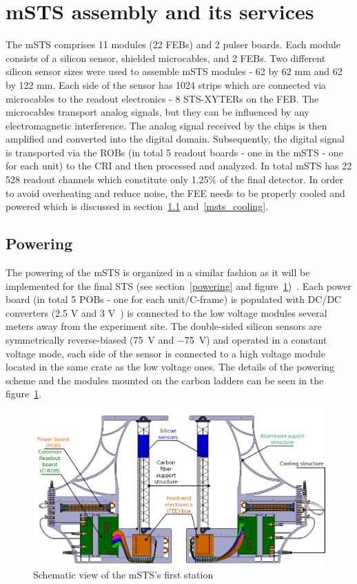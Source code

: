 \section{mSTS assembly and its services}
 The \gls{mSTS} comprises 11 modules (22 \glspl{FEB}) and 2 pulser boards. Each module consists of a silicon sensor, shielded microcables, and 2 \gls{FEB}s. Two different silicon sensor sizes were used to assemble \gls{mSTS} modules - 62 by 62 mm and 62 by 122 mm. Each side of the sensor has 1024 strips which are connected via microcables to the readout electronics - 8 STS-XYTERs on the \gls{FEB}. The microcables transport analog signals, but they can be influenced by any electromagnetic interference. The analog signal received by the chips is then amplified and converted into the digital domain. Subsequently, the digital signal is transported via the \gls{ROB}s (in total 5 readout boards - one in the \gls{mSTS} - one for each unit) to the \gls{CRI} and then processed and analyzed. In total \gls{mSTS} has 22 528 readout channels which constitute only 1.25\% of the final detector. In order to avoid overheating and reduce noise, the \gls{FEE} needs to be properly cooled and powered which is discussed in section~\ref{msts_powering} and~\ref{msts_cooling}. 
\subsection{Powering}
\label{msts_powering}
The powering of the \gls{mSTS} is organized in a similar fashion as it will be implemented for the final \gls{STS} (see section~\ref{powering} and figure~\ref{fig_msts_scheme})~\cite{Koczon:2020Jc}. Each power board (in total 5 \glspl{POB} - one for each unit/C-frame) is populated with DC/DC converters (2.5 V and 3 V~\cite{DC_DC_converter}) is connected to the low voltage modules several meters away from the experiment site. The double-sided silicon sensors are symmetrically reverse-biased (\SI{75}{V} and \SI{-75}{V}) and operated in a constant voltage mode, each side of the sensor is connected to a high voltage module located in the same crate as the low voltage ones. The details of the powering scheme and the modules mounted on the carbon ladders can be seen in the figure~\ref{fig_msts_scheme}.

\begin{figure}[!h]
\centering
\includegraphics[width=0.9\columnwidth]{Chapter6/DCS/images/unit0.png}
\caption{Schematic view of the \gls{mSTS}'s first station}
\label{fig_msts_scheme}
\end{figure}
\newpage
